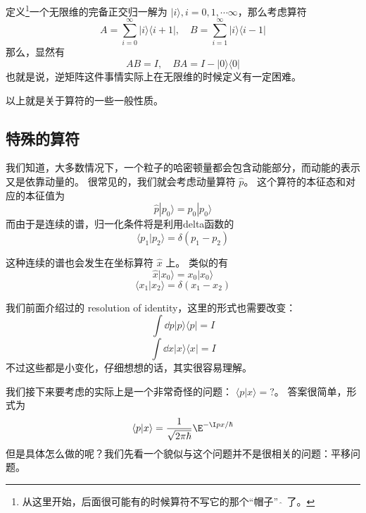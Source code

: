 \begin{example}{}
定义\footnote{从这里开始，后面很可能有的时候算符不写它的那个“帽子” $\hat{\ }$ 了。}一个无限维的完备正交归一解为 $|i\rangle, i = 0, 1, \cdots \infty$，那么考虑算符
\begin{equation}
A =  \sum_{i = 0}^{\infty} |i\rangle\langle i+1|,\quad B = \sum_{i = 1}^{\infty}|i\rangle\langle i-1|
\end{equation}
那么，显然有
\begin{equation}
AB = I,\quad BA = I - |0\rangle\langle0|
\end{equation}
也就是说，逆矩阵这件事情实际上在无限维的时候定义有一定困难。
\end{example}

以上就是关于算符的一些一般性质。

\subsection{特殊的算符}

我们知道，大多数情况下，一个粒子的哈密顿量都会包含动能部分，而动能的表示又是依靠动量的。 很常见的，我们就会考虑动量算符 $\hat p$。 这个算符的本征态和对应的本征值为
\begin{equation}
\hat p|p_0\rangle = p_0 |p_0\rangle
\end{equation}
而由于是连续的谱，归一化条件将是利用delta函数的
\begin{equation}
\langle p_1|p_2\rangle = \delta(p_1-p_2)
\end{equation}

这种连续的谱也会发生在坐标算符 $\hat x$ 上。 类似的有
\begin{equation}
\hat x|x_0\rangle = x_0 |x_0\rangle
\end{equation}
\begin{equation}
\langle x_1|x_2\rangle = \delta(x_1-x_2)
\end{equation}

我们前面介绍过的 resolution of identity，这里的形式也需要改变：
\begin{equation}
\int \dd{p}|p\rangle\langle p| = I
\end{equation}
\begin{equation}
\int \dd{x}|x\rangle\langle x| = I
\end{equation}
不过这些都是小变化，仔细想想的话，其实很容易理解。

我们接下来要考虑的实际上是一个非常奇怪的问题： $\langle p|x\rangle = ?$。 答案很简单，形式为
\begin{equation}
\langle p|x\rangle = \frac{1}{\sqrt{2\pi \hbar}}\E^{-\I px/\hbar}
\end{equation}
但是具体怎么做的呢？我们先看一个貌似与这个问题并不是很相关的问题：平移问题。


